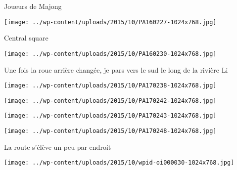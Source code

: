  

 Joueurs de Majong 

 

\begin{center} \texttt{[image: ../wp-content/uploads/2015/10/PA160227-1024x768.jpg]} \end{center}

 

 Central square 

 

\begin{center} \texttt{[image: ../wp-content/uploads/2015/10/PA160230-1024x768.jpg]} \end{center}

 

 Une fois la roue arrière changée, je pars vers le sud le long de la rivière Li 

 

\begin{center} \texttt{[image: ../wp-content/uploads/2015/10/PA170238-1024x768.jpg]} \end{center}

 

 

\begin{center} \texttt{[image: ../wp-content/uploads/2015/10/PA170242-1024x768.jpg]} \end{center}

 

 

\begin{center} \texttt{[image: ../wp-content/uploads/2015/10/PA170243-1024x768.jpg]} \end{center}

 

 

\begin{center} \texttt{[image: ../wp-content/uploads/2015/10/PA170248-1024x768.jpg]} \end{center}

 

 La route s'élève un peu par endroit 

 

\begin{center} \texttt{[image: ../wp-content/uploads/2015/10/wpid-oi000030-1024x768.jpg]} \end{center}

 

